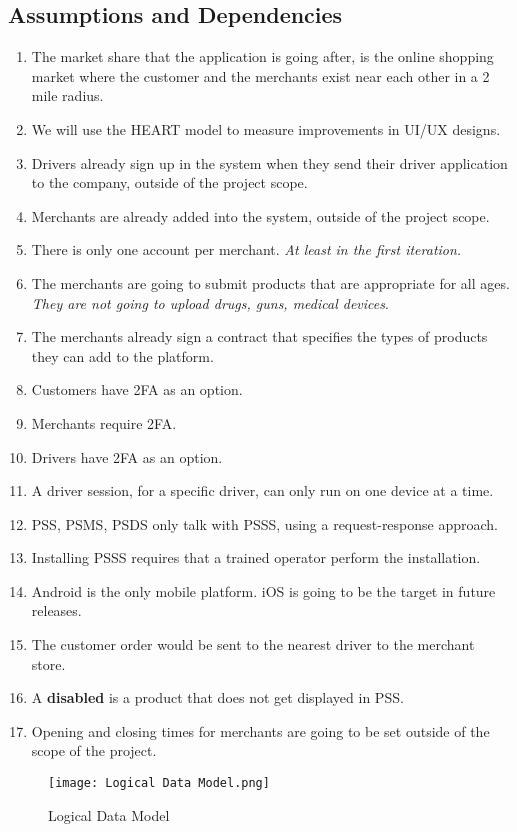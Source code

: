 \subsection{Assumptions and Dependencies}
\begin{enumerate}[label=AS-\arabic*]
    \item The market share that the application is going after, is the online 
    shopping market where the customer and the merchants exist near each other
    in a 2 mile radius.
    \item We will use the HEART model \cite{heart} to measure improvements 
    in UI/UX designs.
    \item Drivers already sign up in the system when they send their 
    driver application to the company, outside of the project scope.
    \item Merchants are already added into the system, outside of the 
    project scope.
    \item There is only one account per merchant. \textit{At least in the first 
    iteration.}
    \item The merchants are going to submit products that are appropriate for 
    all ages. \textit{They are not going to upload drugs, guns, medical 
    devices}.
    \item The merchants already sign a contract that specifies the types of 
    products they can add to the platform.
    \item Customers have 2FA \cite{2fa} as an option.
    \item Merchants require 2FA.
    \item Drivers have 2FA as an option.
    \item A driver session, for a specific driver, can only run on one 
    device at a time.
    \item PSS, PSMS, PSDS only talk with PSSS, using a request-response 
    approach.
    \item Installing PSSS requires that a trained operator perform 
    the installation.
    \item Android is the only mobile platform. iOS is going to be the target 
    in future releases.
    \item The customer order would be sent to the nearest driver to the 
    merchant store.
    \item A \textbf{disabled} is a product that does not get displayed in PSS.
    \item Opening and closing times for merchants are going to be set outside 
    of the scope of the project.
\end{enumerate}
\begin{figure}[!htb]
    \centering
    \texttt{[image: Logical Data Model.png]}
    \caption{Logical Data Model}
    \label{fig:data-model}
\end{figure}

